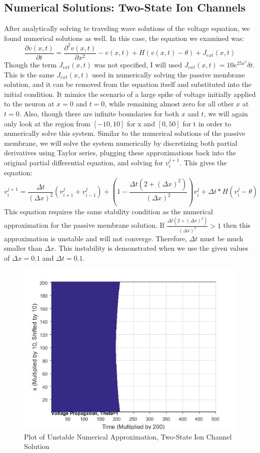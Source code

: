 \documentclass[12pt]{article}
\begin{document}
\subsection{Numerical Solutions: Two-State Ion Channels}
After analytically solving te traveling wave solutions of the voltage equation, we found numerical solutions as well. In this case, the equation we examined was:
\[\frac{\partial{v(x,t)}}{\partial{t}}=\frac{\partial^2{v(x,t)}}{\partial{x}^2}-v(x,t)+H(v(x,t)-\theta)+J_{ext}(x,t)\]
Though the term $J_{ext}(x,t)$ was not specified, I will used $J_{ext}(x,t)=10e^{25x^2}\delta{t}$. This is the same $J_{ext}(x,t)$ used in numerically solving the passive membrane solution, and it can be removed from the equation itself and substituted into the initial condition. It mimics the scenario of a large spike of voltage initially applied to the neuron at $x=0$ and $t=0$, while remaining almost zero for all other $x$ at $t=0$. Also, though there are infinite boundaries for both $x$ and $t$, we will again only look at the region from $[-10,10]$ for x and $[0,50]$ for t in order to numerically solve this system.  Similar to the numerical solutions of the passive membrane, we will solve the system numerically by discretizing both partial derivatives using Taylor series, plugging these approximations back into the original partial differential equation, and solving for $v^{j+1}_i$. This gives the equation:
\begin{equation} \label{**}
v^{j+1}_i=\frac{\Delta{t}}{(\Delta{x})^2}(v^{j}_{i+1}+v^{j}_{i-1})+(1-\frac{\Delta{t}(2+(\Delta{x})^2)}{(\Delta{x})^2})v^{j}_{i}+\Delta{t}*H(v^j_i-\theta)
\end {equation}
This equation requires the same stability condition as the numerical approximation for the passive membrane solution. If $\frac{\Delta{t}(2+(\Delta{x})^2)}{(\Delta{x})^2}>1$ then this approximation is unstable and will not converge. Therefore, $\Delta{t}$ must be much smaller than $\Delta{x}$. This instability is demonstrated when we use the given values of $\Delta{x}=0.1$ and $\Delta{t}=0.1$. 
\begin{figure}[H]
  \includegraphics[width=\linewidth]{badplot3.jpg}
  \caption{Plot of Unstable Numerical Approximation, Two-State Ion Channel Solution}
  \label{fig:sketch3}
\end{figure}
\end{document}

